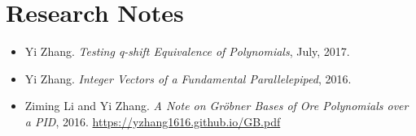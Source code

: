 \documentclass[a4paper,12pt]{article}
\begin{document}
% 
% 

\section*{\Large{Research Notes}}
\begin{itemize}
\item Yi Zhang. {\em Testing q-shift Equivalence of Polynomials}, July, 2017.
\item Yi Zhang. {\em Integer Vectors of a Fundamental Parallelepiped}, 2016.
 \item Ziming Li and Yi Zhang. {\em A Note on Gr\"{o}bner Bases of Ore Polynomials over a PID}, 2016. 
 \url{https://yzhang1616.github.io/GB.pdf} 
\end{itemize}

\end{document}
